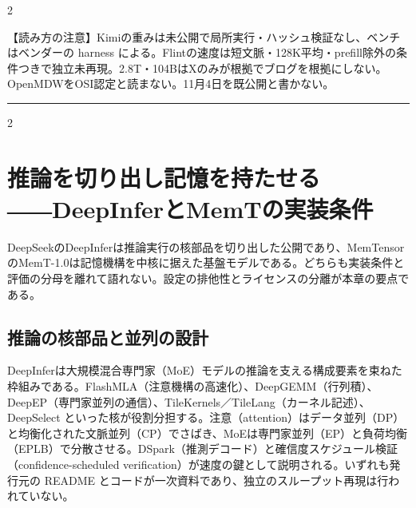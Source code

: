 \documentclass[lualatex,a4paper,10pt]{jlreq}
\begin{document}
\begin{multicols}{2} %


\begin{tcolorbox}[colback=SurveySoft,colframe=SurveyRule,arc=1mm,boxrule=0.4pt,left=2mm,right=2mm]
【読み方の注意】Kimiの重みは未公開で局所実行・ハッシュ検証なし、ベンチはベンダーの harness による。Flintの速度は短文脈・128K平均・prefill除外の条件つきで独立未再現。2.8T・104BはXのみが根拠でブログを根拠にしない。OpenMDWをOSI認定と読まない。11月4日を既公開と書かない。

\end{tcolorbox}


\end{multicols} %
\bigskip\hrule\bigskip %
\begin{multicols}{2} %


\section{推論を切り出し記憶を持たせる――DeepInferとMemTの実装条件}
\label{sec:P2}


DeepSeekのDeepInferは推論実行の核部品を切り出した公開であり、MemTensorのMemT-1.0は記憶機構を中核に据えた基盤モデルである。どちらも実装条件と評価の分母を離れて語れない。設定の排他性とライセンスの分離が本章の要点である。


\subsection*{推論の核部品と並列の設計}


DeepInferは大規模混合専門家（MoE）モデルの推論を支える構成要素を束ねた枠組みである。FlashMLA（注意機構の高速化）、DeepGEMM（行列積）、DeepEP（専門家並列の通信）、TileKernels／TileLang（カーネル記述）、DeepSelect といった核が役割分担する。注意（attention）はデータ並列（DP）と均衡化された文脈並列（CP）でさばき、MoEは専門家並列（EP）と負荷均衡（EPLB）で分散させる。DSpark（推測デコード）と確信度スケジュール検証（confidence-scheduled verification）が速度の鍵として説明される。いずれも発行元の README とコードが一次資料であり、独立のスループット再現は行われていない。


\end{multicols} %
\end{document}
